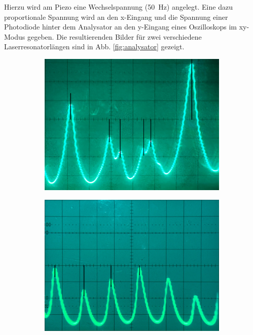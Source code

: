 \documentclass{article}
\begin{document}
Hierzu wird am Piezo eine Wechselspannung (\SI{50}{\Hz}) angelegt.
Eine dazu proportionale Spannung wird an den x-Eingang und die Spannung einer Photodiode hinter
dem Analysator an den y-Eingang eines Oszilloskops im xy-Modus gegeben.
Die resultierenden Bilder für zwei verschiedene Laserresonatorlängen sind in Abb. \ref{fig:analysator} gezeigt.
\begin{figure}[h]
  \centering
  \begin{subfigure}{0.49\textwidth}
    \centering
    \includegraphics[width=\textwidth]{analysator-kurz}
    \label{fig:analysator-kurz}
  \end{subfigure}
  \hfill
  \begin{subfigure}{0.49\textwidth}
    \centering
    \includegraphics[width=\textwidth]{analysator-lang}

\end{subfigure}
\end{figure}
\end{document}
